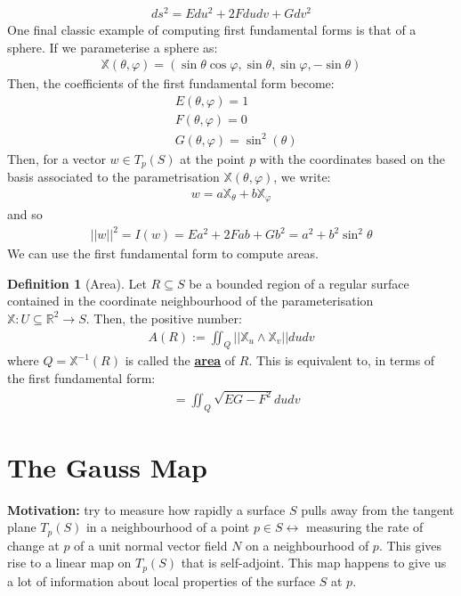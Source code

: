\documentclass[11pt]{scrartcl}
\newcommand{\R}[0]{\mathbb{R}}
\theoremstyle{definition}
\newtheorem{definition}{Definition}
\theoremstyle{remark}
\newcommand{\dfn}[1]{\textbf{\underline{#1}}}
\begin{document}
{\begin{align*}
	ds^2 = E du^2 + 2F du dv + G dv^2 
\end{align*}
One final classic example of computing first fundamental forms is that of a sphere. If we parameterise a sphere as: 
\begin{align*}
	\mathbb{X}(\theta, \varphi) = ( \sin \theta \cos \varphi, \sin \theta, \sin \varphi, - \sin \theta ) 
\end{align*}
Then, the coefficients of the first fundamental form become: 
\begin{align*}
	& E(\theta, \varphi) = 1 \\
	& F(\theta, \varphi) = 0 \\
	& G(\theta, \varphi) = \sin^2 (\theta) 
\end{align*}
Then, for a vector $w \in T_p(S)$ at the point $p$ with the coordinates based on the basis associated to the parametrisation $\mathbb{X}( \theta, \varphi)$, we write: 
\begin{align*}
	w = a \mathbb{X}_\theta + b \mathbb{X}_\varphi 
\end{align*}
and so
\begin{align*}
	||w||^2 = I(w) = Ea^2 + 2Fab + Gb^2 = a^2 + b^2 \sin^2 \theta 
\end{align*}
We can use the first fundamental form to compute areas. 
\begin{definition}[Area]
	Let $R \subseteq S$ be a bounded region of a regular surface contained in the coordinate neighbourhood of the parameterisation $\mathbb{X}: U \subseteq \R^2 \rightarrow S$. Then, the positive number: 
	\begin{align*}
		A(R) := \iint_Q || \mathbb{X}_u \wedge \mathbb{X}_v || du dv 
	\end{align*}
	where $Q = \mathbb{X}^{-1}(R)$ is called the \dfn{area} of $R$. This is equivalent to, in terms of the first fundamental form: 
	\begin{align*}
		& = \iint_Q \sqrt{EG - F^2} du dv 
	\end{align*}
\end{definition}

\section{The Gauss Map}
\textbf{Motivation:} try to measure how rapidly a surface $S$ pulls away from the tangent plane $T_p(S)$ in a neighbourhood of a point $p \in S \leftrightarrow$ measuring the rate of change at $p$ of a unit normal vector field $N$ on a neighbourhood of $p$. This gives rise to a linear map on $T_p(S)$ that is self-adjoint. This map happens to give us a lot of information about local properties of the surface $S$ at $p$. 

}
\end{document}
